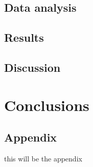 \documentclass[oneside,a4paper,11pt]{report}
\begin{document}
 
 



\section{Data analysis}






\section{Results}
\section{Discussion}
\chapter{Conclusions}



\nocite{2004bhwd.book.....S}
\nocite{2009A&A...496..121B}
\nocite{accpower:1}
\nocite{2005A&A...435..191S}
\nocite{2008A&A...489.1121R}
\nocite{2010A&A...520A..25Y}
\nocite{warner:1}
\nocite{2006A&A...450..117S}
\nocite{rybicki:1}
\nocite{1973PThPh..49.1184A_aizu}
\nocite{astrop_techniques_5th}
\nocite{xray_hanbook}
\nocite{1972ApJ...175..417N}
\nocite{kleczek}
\nocite{comp_obj1}
\nocite{1939MNRAS..99..673C}
\nocite{2012MNRAS.419..336M}




\clearpage

\appendix
\section*{Appendix}
this will be the appendix
\end{document}

